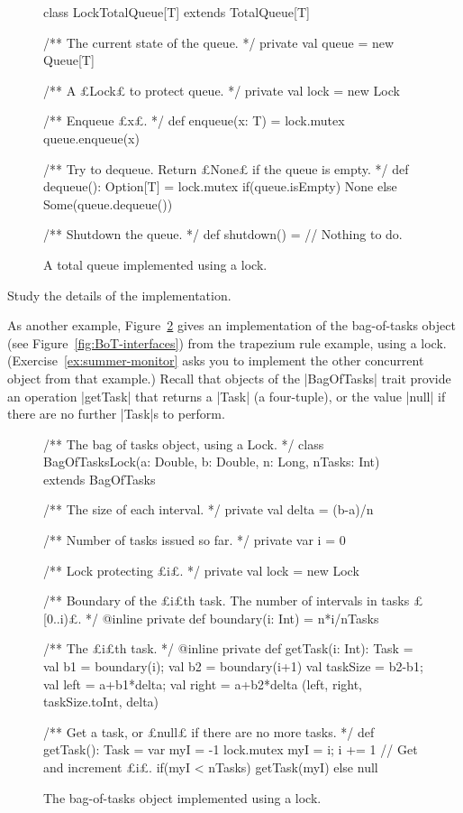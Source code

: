 
\begin{figure}
\begin{scala}
class LockTotalQueue[T] extends TotalQueue[T]{
  /** The current state of the queue. */
  private val queue = new Queue[T]

  /** A £Lock£ to protect queue. */
  private val lock = new Lock

  /** Enqueue £x£. */
  def enqueue(x: T) = lock.mutex{ queue.enqueue(x) }

  /** Try to dequeue.  Return £None£ if the queue is empty. */
  def dequeue(): Option[T] = lock.mutex{ 
    if(queue.isEmpty) None else Some(queue.dequeue()) 
  }

  /** Shutdown the queue. */
  def shutdown() = {} // Nothing to do.
}
\end{scala}
\caption{A total queue implemented using a lock.}
\label{fig:LockTotalQueue}
\end{figure}


\begin{instruction}
Study the details of the implementation.
\end{instruction}


As another example, Figure~\ref{fig:BagOfTasksLock} gives an implementation of
the bag-of-tasks object (see Figure~\ref{fig:BoT-interfaces}) from the
trapezium rule example, using a lock.  (Exercise~\ref{ex:summer-monitor} asks
you to implement the other concurrent object from that example.)  Recall that
objects of the |BagOfTasks| trait provide an operation |getTask| that returns
a |Task| (a four-tuple), or the value |null| if there are no further |Task|s
to perform.


\begin{figure}
\begin{scala}
/** The bag of tasks object, using a Lock. */
class BagOfTasksLock(a: Double, b: Double, n: Long, nTasks: Int)
    extends BagOfTasks{ 
  /** The size of each interval. */
  private val delta = (b-a)/n

  /** Number of tasks issued so far. */
  private var i = 0

  /** Lock protecting £i£. */
  private val lock = new Lock

  /** Boundary of the £i£th task.  The number of intervals in tasks £[0..i)£. */
  @inline private def boundary(i: Int) = n*i/nTasks

  /** The £i£th task. */
  @inline private def getTask(i: Int): Task = {
    val b1 = boundary(i); val b2 = boundary(i+1)
    val taskSize = b2-b1; val left = a+b1*delta; val right = a+b2*delta
    (left, right, taskSize.toInt, delta)
  }

  /** Get a task, or £null£ if there are no more tasks. */
  def getTask(): Task = {
    var myI = -1
    lock.mutex{ myI = i; i += 1} // Get and increment £i£.
    if(myI < nTasks) getTask(myI) else null
  }
}
\end{scala}
\caption{The bag-of-tasks object implemented using a lock.}
\label{fig:BagOfTasksLock}
\end{figure}

